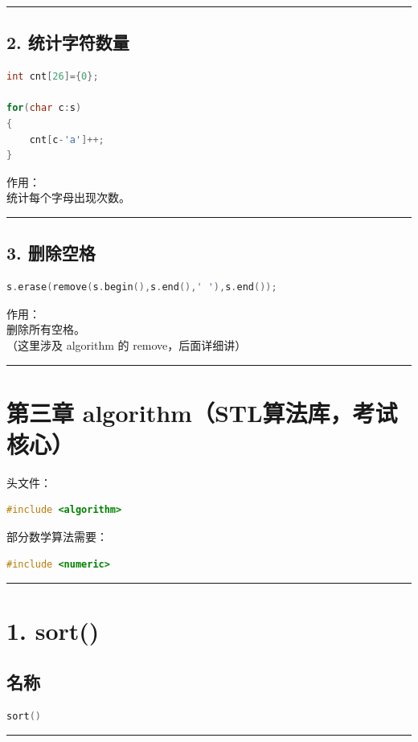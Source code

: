 \documentclass[10pt,twocolumn]{extarticle}
\begin{document}
\noindent\rule{\linewidth}{0.4pt}

\subsection{2. 统计字符数量}
\begin{lstlisting}[language=C++]
int cnt[26]={0};

for(char c:s)
{
    cnt[c-'a']++;
}
\end{lstlisting}
作用：\\
统计每个字母出现次数。

\noindent\rule{\linewidth}{0.4pt}

\subsection{3. 删除空格}
\begin{lstlisting}[language=C++]
s.erase(remove(s.begin(),s.end(),' '),s.end());
\end{lstlisting}
作用：\\
删除所有空格。\\
（这里涉及 algorithm 的 remove，后面详细讲）

\noindent\rule{\linewidth}{0.4pt}
\section{第三章 algorithm（STL算法库，考试核心）}

头文件：
\begin{lstlisting}[language=C++]
#include <algorithm>
\end{lstlisting}
部分数学算法需要：
\begin{lstlisting}[language=C++]
#include <numeric>
\end{lstlisting}

\noindent\rule{\linewidth}{0.4pt}

\section{1. sort()}

\subsection{名称}
\begin{lstlisting}[language=C++]
sort()
\end{lstlisting}

\noindent\rule{\linewidth}{0.4pt}
\end{document}
